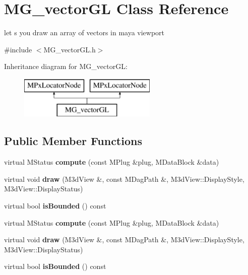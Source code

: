 \hypertarget{class_m_g__vector_g_l}{\section{M\-G\-\_\-vector\-G\-L Class Reference}
\label{class_m_g__vector_g_l}
}


let s you draw an array of vectors in maya viewport  




{\ttfamily \#include $<$M\-G\-\_\-vector\-G\-L.\-h$>$}

Inheritance diagram for M\-G\-\_\-vector\-G\-L\-:\begin{figure}[H]
\begin{center}
\leavevmode
\includegraphics[height=2.000000cm]{class_m_g__vector_g_l}
\end{center}
\end{figure}
\subsection*{Public Member Functions}
\begin{DoxyCompactItemize}
\item 
\hypertarget{class_m_g__vector_g_l_ab1e2e5081a30bbf5dce3e0b010990719}{virtual M\-Status {\bfseries compute} (const M\-Plug \&plug, M\-Data\-Block \&data)}\label{class_m_g__vector_g_l_ab1e2e5081a30bbf5dce3e0b010990719}

\item 
\hypertarget{class_m_g__vector_g_l_adef6c3a74ae350ef344956af36953347}{virtual void {\bfseries draw} (M3d\-View \&, const M\-Dag\-Path \&, M3d\-View\-::\-Display\-Style, M3d\-View\-::\-Display\-Status)}\label{class_m_g__vector_g_l_adef6c3a74ae350ef344956af36953347}

\item 
\hypertarget{class_m_g__vector_g_l_afceff90a8f00ef5f68c2b41032e0a3ec}{virtual bool {\bfseries is\-Bounded} () const }\label{class_m_g__vector_g_l_afceff90a8f00ef5f68c2b41032e0a3ec}

\item 
\hypertarget{class_m_g__vector_g_l_ab1e2e5081a30bbf5dce3e0b010990719}{virtual M\-Status {\bfseries compute} (const M\-Plug \&plug, M\-Data\-Block \&data)}\label{class_m_g__vector_g_l_ab1e2e5081a30bbf5dce3e0b010990719}

\item 
\hypertarget{class_m_g__vector_g_l_adef6c3a74ae350ef344956af36953347}{virtual void {\bfseries draw} (M3d\-View \&, const M\-Dag\-Path \&, M3d\-View\-::\-Display\-Style, M3d\-View\-::\-Display\-Status)}\label{class_m_g__vector_g_l_adef6c3a74ae350ef344956af36953347}

\item 
\hypertarget{class_m_g__vector_g_l_afceff90a8f00ef5f68c2b41032e0a3ec}{virtual bool {\bfseries is\-Bounded} () const }\label{class_m_g__vector_g_l_afceff90a8f00ef5f68c2b41032e0a3ec}

\end{DoxyCompactItemize}
